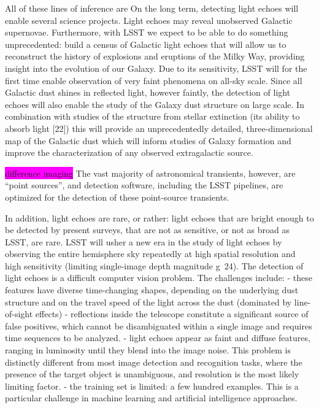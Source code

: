 \documentclass{proposalnsf}
\newcommand{\changeit}[1]{\colorbox{magenta}{#1}}
\begin{document}
All of these lines of inference are 
On the long term, detecting light echoes will enable several science projects.
Light echoes may reveal unobserved Galactic supernovae.  Furthermore, with LSST we expect to be able to do something unprecedented: build a census of Galactic light echoes that will allow us to reconstruct the history of explosions and eruptions of the Milky Way, providing insight into the evolution of our Galaxy.  Due to its sensitivity, LSST will for the first time enable observation of very faint phenomena on all-sky scale.  Since all Galactic dust shines in reflected light, however faintly, the detection of light echoes will also enable the study of the Galaxy dust structure on large scale.  In combination with studies of the structure from stellar extinction (its ability to absorb light [22]) this will provide an unprecedentedly detailed, three-dimensional map of the Galactic dust which will inform studies of Galaxy formation and improve the characterization of any observed extragalactic source. 


\changeit{difference imaging}
The vast majority of astronomical transients, however, are “point sources”, and detection software, including the LSST pipelines, are optimized for the detection of these point-source transients.



In addition, light echoes are rare, or rather: light echoes that are bright enough to be detected by present surveys, that are not as sensitive, or not as broad as LSST, are rare. LSST will usher a new era in the study of light echoes by observing the entire hemisphere sky repeatedly at high spatial resolution and high sensitivity (limiting single-image depth magnitude g~24). 
The detection of light echoes is a difficult computer vision problem.  The challenges include:
- these features have diverse time-changing shapes, depending on the underlying dust structure and on the travel speed of the light across the dust (dominated by line-of-sight effects)
- reflections inside the telescope constitute a significant source of false positives, which cannot be disambiguated within a single image and requires time sequences to be analyzed.
- light echoes appear as faint and diffuse features, ranging in luminosity until they blend into the image noise.  This problem is distinctly different from most image detection and recognition tasks, where the presence of the target object is unambiguous, and resolution is the most likely limiting factor.  
- the training set is limited: a few hundred examples.  This is a particular challenge in machine learning and artificial intelligence approaches. 
\end{document}
